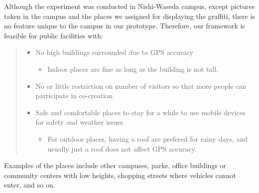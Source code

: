 Although the experiment was conducted in Nishi-Waseda campus, except pictures taken in the campus and the places we assigned for displaying the graffiti,
there is no feature unique to the campus in our prototype.
Therefore, our framework is feasible for public facilities with:
\begin{quote}
  \begin{itemize}
    \item No high buildings surrounded due to GPS accuracy
      \begin{itemize}
        \item Indoor places are fine as long as the building is not tall.
      \end{itemize}
    \item No or little restriction on number of visitors so that more people can participate in co-creation
    \item Safe and comfortable places to stay for a while to use mobile devices for safety and weather issues
      \begin{itemize}
        \item For outdoor places, having a roof are prefered for rainy days, and usually just a roof does not affect GPS accuracy.
      \end{itemize}
  \end{itemize}
\end{quote}

Examples of the places include other campuses, parks, office buildings or community centers with low heights, shopping streets where vehicles cannot enter, and so on.